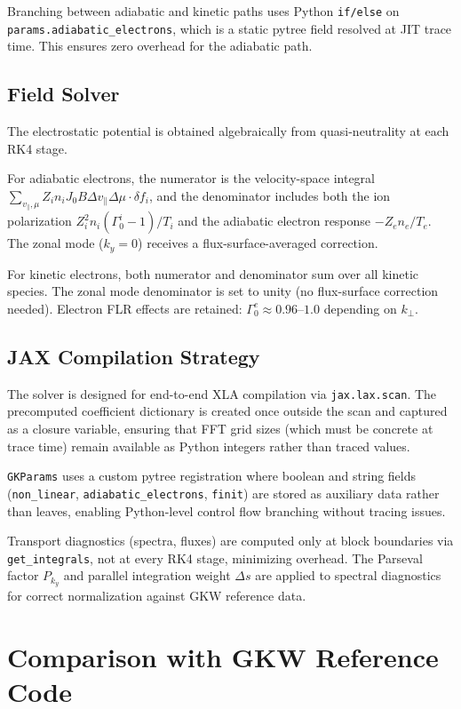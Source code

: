 \documentclass{article}
\theoremstyle{plain}
\theoremstyle{definition}
\theoremstyle{remark}
\begin{document}
Branching between adiabatic and kinetic paths uses Python \texttt{if/else} on \texttt{params.adiabatic\_electrons}, which is a static pytree field resolved at JIT trace time. This ensures zero overhead for the adiabatic path.

\subsection{Field Solver}
The electrostatic potential is obtained algebraically from quasi-neutrality at each RK4 stage.

For adiabatic electrons, the numerator is the velocity-space integral $\sum_{v_\parallel,\mu} Z_i n_i J_0 B \Delta v_\parallel \Delta\mu \cdot \delta f_i$, and the denominator includes both the ion polarization $Z_i^2 n_i (\Gamma_0^i - 1)/T_i$ and the adiabatic electron response $-Z_e n_e / T_e$. The zonal mode ($k_y=0$) receives a flux-surface-averaged correction.

For kinetic electrons, both numerator and denominator sum over all kinetic species. The zonal mode denominator is set to unity (no flux-surface correction needed). Electron FLR effects are retained: $\Gamma_0^e \approx 0.96$--$1.0$ depending on $k_\perp$.

\subsection{JAX Compilation Strategy}
The solver is designed for end-to-end XLA compilation via \texttt{jax.lax.scan}. The precomputed coefficient dictionary is created once outside the scan and captured as a closure variable, ensuring that FFT grid sizes (which must be concrete at trace time) remain available as Python integers rather than traced values.

\texttt{GKParams} uses a custom pytree registration where boolean and string fields (\texttt{non\_linear}, \texttt{adiabatic\_electrons}, \texttt{finit}) are stored as auxiliary data rather than leaves, enabling Python-level control flow branching without tracing issues.

Transport diagnostics (spectra, fluxes) are computed only at block boundaries via \texttt{get\_integrals}, not at every RK4 stage, minimizing overhead. The Parseval factor $P_{k_y}$ and parallel integration weight $\Delta s$ are applied to spectral diagnostics for correct normalization against GKW reference data.

\section{Comparison with GKW Reference Code}
\label{app:gkw_comparison}
\end{document}
